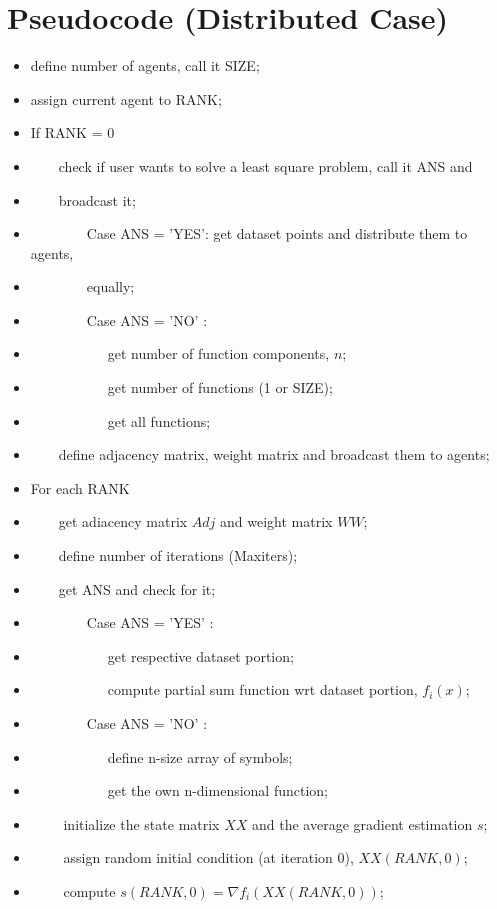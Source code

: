 \documentclass[a4paper,11pt,oneside]{book}
\begin{document}
{\begin{figure}
\end{figure}

\section{Pseudocode (Distributed Case)}
\small
{\linespread{0.33}\selectfont
\begin{itemize}
\item[]define number of agents, call it SIZE;
\item[]assign current agent to RANK;
\item[]If RANK = 0
\item[]~~~~check if user wants to solve a least square problem, call it ANS and 
\item[]~~~~broadcast it;
\item[]~~~~~~~~Case ANS = 'YES': get dataset points and distribute them to agents,
\item[]~~~~~~~~equally; 
\item[]~~~~~~~~Case ANS = 'NO' :
\item[]~~~~~~~~~~~get number of function components, $n$;
\item[]~~~~~~~~~~~get number of functions (1 or SIZE);
\item[]~~~~~~~~~~~get all functions;
\item[]~~~~define adjacency matrix, weight matrix and broadcast them to agents; 
\item[]For each RANK
\item[]~~~~get adiacency matrix $Adj$ and weight matrix $WW$;
\item[]~~~~define number of iterations (Maxiters);
\item[]~~~~get ANS and check for it;
\item[]~~~~~~~~Case ANS = 'YES' :
\item[]~~~~~~~~~~~get respective dataset portion;
\item[]~~~~~~~~~~~compute partial sum function wrt dataset portion, $f_i(x)$;
\item[]~~~~~~~~Case ANS = 'NO' :
\item[]~~~~~~~~~~~define n-size array of symbols;
\item[]~~~~~~~~~~~get the own n-dimensional function;
\item[]~~~~ initialize the state matrix $XX$ and the average gradient estimation $s$;
\item[]~~~~ assign random initial condition (at iteration 0), $XX(RANK,0)$;
\item[]~~~~ compute $ s(RANK,0) = \nabla f_i(XX(RANK,0))$;

\end{itemize}}}
\end{document}
